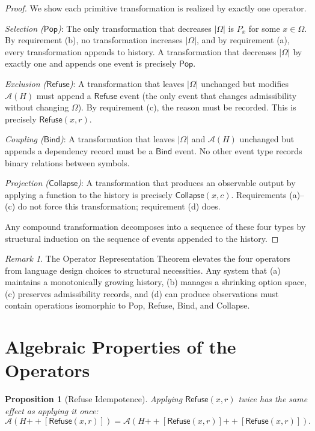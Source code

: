 \documentclass[12pt, a4paper, openany]{book}
\theoremstyle{plain}
\newtheorem{proposition}[theorem]{Proposition}
\theoremstyle{definition}
\theoremstyle{remark}
\newtheorem{remark}[theorem]{Remark}
\newcommand{\Pop}{\mathsf{Pop}}
\newcommand{\Refuse}{\mathsf{Refuse}}
\newcommand{\Bind}{\mathsf{Bind}}
\newcommand{\Collapse}{\mathsf{Collapse}}
\newcommand{\calA}{\mathcal{A}}
\begin{document}
\begin{proof}
We show each primitive transformation is realized by exactly one operator.

\textit{Selection ($\Pop$)}: The only transformation that decreases $|\Omega|$
is $P_x$ for some $x \in \Omega$. By requirement (b), no transformation increases
$|\Omega|$, and by requirement (a), every transformation appends to history.
A transformation that decreases $|\Omega|$ by exactly one and appends one event
is precisely $\Pop$.

\textit{Exclusion ($\Refuse$)}: A transformation that leaves $|\Omega|$ unchanged
but modifies $\calA(H)$ must append a $\Refuse$ event (the only event that
changes admissibility without changing $\Omega$). By requirement (c), the
reason must be recorded. This is precisely $\Refuse(x, r)$.

\textit{Coupling ($\Bind$)}: A transformation that leaves $|\Omega|$ and
$\calA(H)$ unchanged but appends a dependency record must be a $\Bind$ event.
No other event type records binary relations between symbols.

\textit{Projection ($\Collapse$)}: A transformation that produces an observable
output by applying a function to the history is precisely $\Collapse(x, c)$.
Requirements (a)--(c) do not force this transformation; requirement (d) does.

Any compound transformation decomposes into a sequence of these four types by
structural induction on the sequence of events appended to the history.
\end{proof}

\begin{remark}
The Operator Representation Theorem elevates the four operators from language
design choices to structural necessities. Any system that (a) maintains a
monotonically growing history, (b) manages a shrinking option space, (c)
preserves admissibility records, and (d) can produce observations must contain
operations isomorphic to Pop, Refuse, Bind, and Collapse.
\end{remark}

\section{Algebraic Properties of the Operators}

\begin{proposition}[Refuse Idempotence]
Applying $\Refuse(x, r)$ twice has the same effect as applying it once:
\[
\calA(H \mathbin{++} [\Refuse(x,r)]) = \calA(H \mathbin{++} [\Refuse(x,r)] \mathbin{++} [\Refuse(x,r)]).
\]
\end{proposition}
\end{document}
